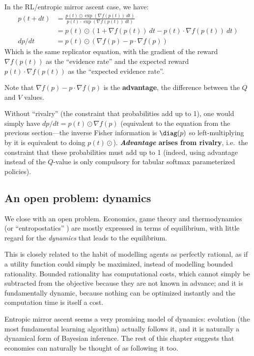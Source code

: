 In the RL/entropic mirror ascent case, we have:
\begin{align*}
p(t+dt) &=\frac{p(t)\odot \exp\left(\nabla f(p(t))\ dt\right)}{p(t)\cdot \exp\left(\nabla f(p(t))\ dt\right)}\\
&= p(t)\odot (1 +\nabla f(p(t))\ dt-p(t)\cdot \nabla f(p(t))\ dt)\\
dp/dt&= p(t)\odot (\nabla f(p)-p\cdot \nabla f(p))
\end{align*}
Which is the same replicator equation, with the gradient of the reward $\nabla f(p(t))$ as
the ``evidence rate'' and the expected reward $p(t)\cdot \nabla f(p(t))$ as the ``expected
evidence rate''.

Note that $\nabla f(p)-p\cdot \nabla f(p)$ is the \textbf{advantage}, the difference
between the $Q$ and $V$ values.

Without ``rivalry'' (the constraint that probabilities add up to 1), one would simply
have $dp/dt= p(t)\odot \nabla f(p)$ (equivalent to the equation from the previous
section---the inverse Fisher information is $\diag(p)$ so left-multiplying by it is
equivalent to doing $p(t)\odot$). \textbf{\emph{Advantage} arises from rivalry}, i.e.\ the
constraint that these probabilities must add up to 1 (indeed, using advantage instead of the
$Q$-value is only compulsory for tabular softmax parameterized policies).

\subsection{An open problem: dynamics}\label{agency:sec:dynamics-confusion}

We close with an open problem. Economics, game theory and thermodynamics (or
``entropostatics'' \citep{liuEquilibriumThermoeconomics}) are mostly expressed in terms of
equilibrium, with little regard for the \emph{dynamics} that leads to the equilibrium.

This is closely related to the habit of modelling agents as perfectly rational, as if a
utility function could simply be maximized, instead of modelling bounded rationality.
Bounded rationality has computational costs, which cannot simply be subtracted from the
objective because they are not known in advance; and it is fundamentally dynamic, because
nothing can be optimized instantly and the computation time is itself a cost.

Entropic mirror ascent seems a very promising model of dynamics: evolution (the most
fundamental learning algorithm) actually follows it, and it is naturally a dynamical form of
Bayesian inference. The rest of this chapter suggests that economies can naturally be
thought of as following it too.

